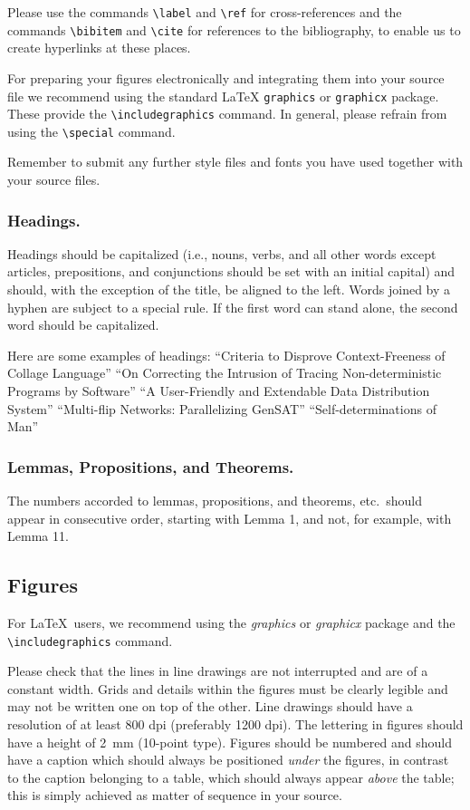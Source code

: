 \documentclass[runningheads,a4paper]{llncs}
\begin{document}
Please use the commands \verb+\label+ and \verb+\ref+ for
cross-references and the commands \verb+\bibitem+ and \verb+\cite+ for
references to the bibliography, to enable us to create hyperlinks at
these places.

For preparing your figures electronically and integrating them into
your source file we recommend using the standard \LaTeX{} \verb+graphics+ or
\verb+graphicx+ package. These provide the \verb+\includegraphics+ command.
In general, please refrain from using the \verb+\special+ command.

Remember to submit any further style files and
fonts you have used together with your source files.

\subsubsection{Headings.}

Headings should be capitalized
(i.e., nouns, verbs, and all other words
except articles, prepositions, and conjunctions should be set with an
initial capital) and should,
with the exception of the title, be aligned to the left.
Words joined by a hyphen are subject to a special rule. If the first
word can stand alone, the second word should be capitalized.

Here are some examples of headings: ``Criteria to Disprove
Context-Freeness of Collage Language'' ``On Correcting the Intrusion of
Tracing Non-deterministic Programs by Software'' ``A User-Friendly and
Extendable Data Distribution System'' ``Multi-flip Networks:
Parallelizing GenSAT'' ``Self-determinations of Man''

\subsubsection{Lemmas, Propositions, and Theorems.}

The numbers accorded to lemmas, propositions, and theorems, etc.\ should
appear in consecutive order, starting with Lemma 1, and not, for
example, with Lemma 11.

\subsection{Figures}

For \LaTeX\ users, we recommend using the \emph{graphics} or \emph{graphicx}
package and the \verb+\includegraphics+ command.

Please check that the lines in line drawings are not
interrupted and are of a constant width. Grids and details within the
figures must be clearly legible and may not be written one on top of
the other. Line drawings should have a resolution of at least 800 dpi
(preferably 1200 dpi). The lettering in figures should have a height of
2~mm (10-point type). Figures should be numbered and should have a
caption which should always be positioned \emph{under} the figures, in
contrast to the caption belonging to a table, which should always appear
\emph{above} the table; this is simply achieved as matter of sequence in
your source.
\end{document}
